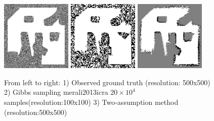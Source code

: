 \documentclass{beamer}
\begin{document}
\begin{frame}
  \begin{figure}
    \includegraphics[width=0.3\textwidth]{figures/gt-final.png}
    \includegraphics[width=0.3\textwidth]{figures/mcmc_100x100.png}
    \includegraphics[width=0.3\textwidth]{figures/two-assumption_100x100.png}
    \caption{From left to right: 1) Observed ground truth (resolution: 500x500) 2) Gibbs sampling merali2013icra $20 \times 10^4$ samples(resolution:100x100) 3) Two-assumption method (resolution:500x500) }
    \label{fig:results}
  \end{figure}
\end{frame}
\end{document}
